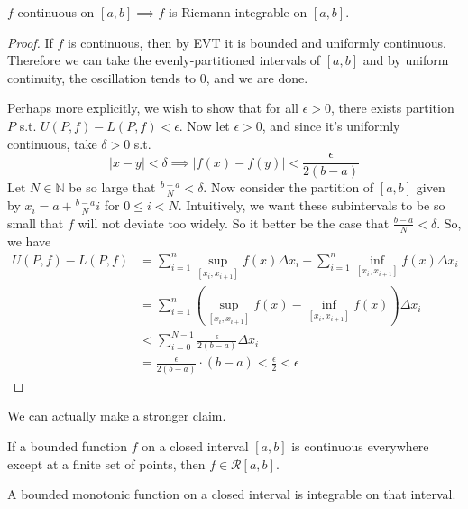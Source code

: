   \begin{theorem}
    \label{thm:continuous-riemann}
    $f$ continuous on $[a, b] \implies f$ is Riemann integrable on $[a, b]$. 
  \end{theorem}
  \begin{proof}
    If $f$ is continuous, then by EVT it is bounded and uniformly continuous. Therefore we can take the evenly-partitioned intervals of $[a, b]$ and by uniform continuity, the oscillation tends to $0$, and we are done. 

    Perhaps more explicitly, we wish to show that for all $\epsilon > 0$, there exists partition $P$ s.t. $U(P, f) - L(P, f) < \epsilon$. Now let $\epsilon > 0$, and since it's uniformly continuous, take $\delta > 0$ s.t. 
    \begin{equation}
      |x - y| < \delta \implies |f(x) - f(y)| < \frac{\epsilon}{2(b-a)}
    \end{equation}
    Let $N \in \mathbb{N}$ be so large that $\frac{b-a}{N} < \delta$. Now consider the partition of $[a, b]$ given by $x_i = a + \frac{b-a}{N} i$ for $0 \leq i < N$. Intuitively, we want these subintervals to be so small that $f$ will not deviate too widely. So it better be the case that $\frac{b - a}{N} < \delta$. So, we have
    \begin{align}
      U(P, f) - L(P, f) & = \sum_{i=1}^n \sup_{[x_i, x_{i+1}]} f(x) \Delta x_i - \sum_{i=1}^n \inf_{[x_i, x_{i+1}]} f(x) \Delta x_i \\ 
                        & = \sum_{i=1}^n (\sup_{[x_i, x_{i+1}]} f(x) - \inf_{[x_i, x_{i+1}]} f(x) ) \Delta x_i \\ 
                        & < \sum_{i=0}^{N-1} \frac{\epsilon}{2 (b - a)} \Delta x_i \\
                        & = \frac{\epsilon}{2 (b - a)} \cdot (b - a) < \frac{\epsilon}{2} < \epsilon
    \end{align}
  \end{proof}

  We can actually make a stronger claim. 

  \begin{corollary}
    If a bounded function $f$ on a closed interval $[a, b]$ is continuous everywhere except at a finite set of points, then $f \in \mathcal{R}[a, b]$. 
  \end{corollary}

  \begin{corollary}
    A bounded monotonic function on a closed interval is integrable on that interval. 
  \end{corollary} 


